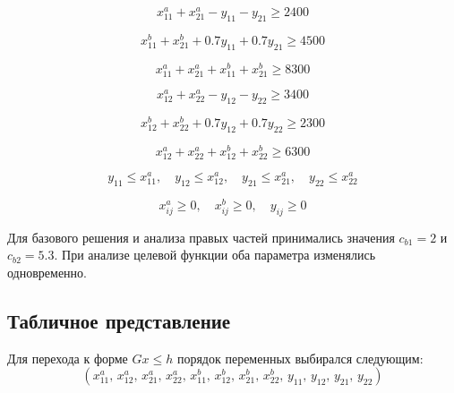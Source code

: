 \documentclass[a4paper,12pt]{article}
\begin{document}
\begin{equation}
x_{11}^a + x_{21}^a - y_{11} - y_{21} \ge 2400
\end{equation}

\begin{equation}
x_{11}^b + x_{21}^b + 0.7y_{11} + 0.7y_{21} \ge 4500
\end{equation}

\begin{equation}
x_{11}^a + x_{21}^a + x_{11}^b + x_{21}^b \ge 8300
\end{equation}

\begin{equation}
x_{12}^a + x_{22}^a - y_{12} - y_{22} \ge 3400
\end{equation}

\begin{equation}
x_{12}^b + x_{22}^b + 0.7y_{12} + 0.7y_{22} \ge 2300
\end{equation}

\begin{equation}
x_{12}^a + x_{22}^a + x_{12}^b + x_{22}^b \ge 6300
\end{equation}

\begin{equation}
y_{11} \le x_{11}^a,\quad
y_{12} \le x_{12}^a,\quad
y_{21} \le x_{21}^a,\quad
y_{22} \le x_{22}^a
\end{equation}

\begin{equation}
x_{ij}^a \ge 0,\quad x_{ij}^b \ge 0,\quad y_{ij} \ge 0
\end{equation}

Для базового решения и анализа правых частей принимались значения
$c_{b1} = 2$ и $c_{b2} = 5.3$. При анализе целевой функции оба параметра
изменялись одновременно.

\subsection{Табличное представление}

Для перехода к форме $Gx \le h$ порядок переменных выбирался следующим:
\[
\left(
x_{11}^a,\,
x_{12}^a,\,
x_{21}^a,\,
x_{22}^a,\,
x_{11}^b,\,
x_{12}^b,\,
x_{21}^b,\,
x_{22}^b,\,
y_{11},\,
y_{12},\,
y_{21},\,
y_{22}
\right)
\]
\end{document}
